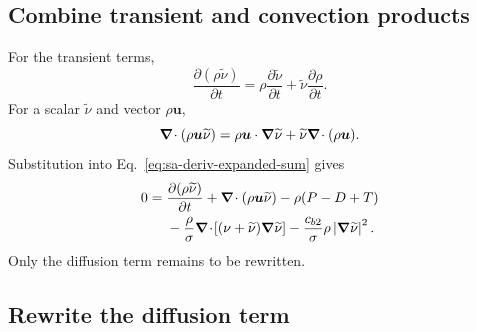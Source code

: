 \subsection{Combine transient and convection products}

For the transient terms,
\begin{equation}
  \frac{\partial(\rho\widetilde{\nu})}{\partial t}
  =\rho\frac{\partial\widetilde{\nu}}{\partial t}
  +\widetilde{\nu}\frac{\partial\rho}{\partial t}.
  \label{eq:sa-deriv-transient-product}
\end{equation}
For a scalar \(\widetilde{\nu}\) and vector \(\rho\boldsymbol u\),
\begin{equation}
  \boldsymbol{\nabla}\!\cdot(\rho\boldsymbol u\widetilde{\nu})
  =\rho\boldsymbol u\mathbin{\cdot}\boldsymbol{\nabla}\widetilde{\nu}
  +\widetilde{\nu}\boldsymbol{\nabla}\!\cdot(\rho\boldsymbol u).
  \label{eq:sa-deriv-convection-product}
\end{equation}
Substitution into Eq.~\eqref{eq:sa-deriv-expanded-sum} gives
\begin{align}
  0={}&
  \frac{\partial(\rho\widetilde{\nu})}{\partial t}
  +\boldsymbol{\nabla}\!\cdot(\rho\boldsymbol u\widetilde{\nu})
  -\rho(P-D+T) \notag\\
  &-\frac{\rho}{\sigma}
   \boldsymbol{\nabla}\!\cdot\!\left[(\nu+\widetilde{\nu})\boldsymbol{\nabla}\widetilde{\nu}\right]
  -\frac{c_{b2}}{\sigma}\rho
   \left|\boldsymbol{\nabla}\widetilde{\nu}\right|^2.
  \label{eq:sa-deriv-before-diffusion-rewrite}
\end{align}
Only the diffusion term remains to be rewritten.

\subsection{Rewrite the diffusion term}

